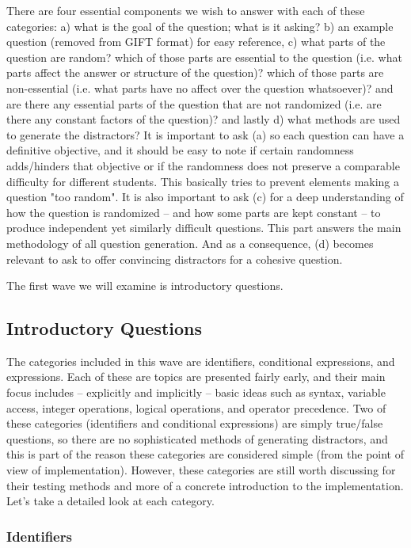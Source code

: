 \documentclass{article}
\begin{document}
There are four essential components we wish to answer with each of these categories: a) what is the goal of the question; what is it asking? b) an example question
(removed from GIFT format) for easy reference, c) what parts of the question are random? which of those parts are essential to the question (i.e. what
parts affect the answer or structure of the question)? which of those parts are non-essential (i.e. what parts have no affect over the question whatsoever)?
and are there any essential parts of the question that are not randomized (i.e. are there any constant factors of the question)? and lastly d) what methods
are used to generate the distractors? It is important to ask (a) so each question can have a definitive objective, and it should be easy to note if
certain randomness adds/hinders that objective or if the randomness does not preserve a comparable difficulty for different students.
This basically tries to prevent elements making a question "too random". It is also important to ask (c) for a deep understanding of how the question
is randomized -- and how some parts are kept constant -- to produce independent yet similarly difficult questions. This part answers the main
methodology of all question generation. And as a consequence, (d) becomes relevant to ask to offer convincing distractors for a cohesive question.

The first wave we will examine is introductory questions.

\subsection{Introductory Questions}
The categories included in this wave are identifiers, conditional expressions, and expressions. Each of these are topics are presented fairly early, and their main
focus includes -- explicitly and implicitly -- basic ideas such as syntax, variable access, integer operations, logical operations, and operator precedence.
Two of these categories (identifiers and conditional expressions) are simply true/false questions, so there are no sophisticated methods of generating
distractors, and this is part of the reason these categories are considered simple (from the point of view of implementation). However, these categories are still
worth discussing for their testing methods and more of a concrete introduction to the implementation. Let's take a detailed look at each category.

\subsubsection{Identifiers}
\end{document}
